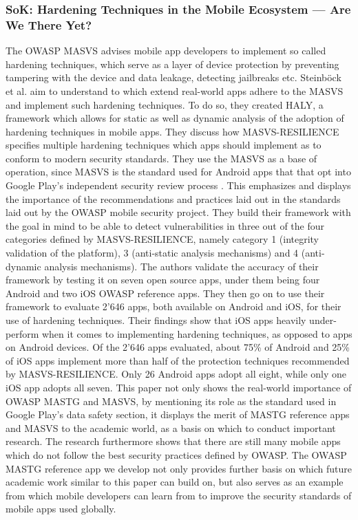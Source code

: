 \subsubsection{SoK: Hardening Techniques in the Mobile Ecosystem — Are We There Yet?}
The OWASP MASVS advises mobile app developers to implement so called hardening techniques, which serve as a layer of device protection by preventing tampering with the device and data leakage, detecting jailbreaks etc. Steinböck et al. \citep{paper_22} aim to understand to which extend real-world apps adhere to the MASVS and implement such hardening techniques. To do so, they created HALY, a framework which allows for static as well as dynamic analysis of the adoption of hardening techniques in mobile apps. They discuss how MASVS-RESILIENCE specifies multiple hardening techniques which apps should implement as to conform to modern security standards. They use the MASVS as a base of operation, since MASVS is the standard used for Android apps that that opt into Google Play’s independent security review process \citep{paper_22}. This emphasizes and displays the importance of the recommendations and practices laid out in the standards laid out by the OWASP mobile security project. They build their framework with the goal in mind to be able to detect vulnerabilities in three out of the four categories defined by MASVS-RESILIENCE, namely category 1 (integrity validation of the platform), 3 (anti-static analysis mechanisms) and  4 (anti-dynamic analysis mechanisms). The authors validate the accuracy of their framework by testing it on seven open source apps, under them being four Android and two iOS OWASP reference apps. They then go on to use their framework to evaluate 2'646 apps, both available on Android and iOS, for their use of hardening techniques. Their findings show that iOS apps heavily under-perform when it comes to implementing hardening techniques, as opposed to apps on Android devices. Of the 2'646 apps evaluated, about 75\% of Android and 25\% of iOS apps implement more than half of the protection techniques recommended by MASVS-RESILIENCE. Only 26 Android apps adopt all eight, while only one iOS app adopts all seven. This paper not only shows the real-world importance of OWASP MASTG and MASVS, by mentioning its role as the standard used in Google Play's data safety section, it displays the merit of MASTG reference apps and MASVS to the academic world, as a basis on which to conduct important research. The research furthermore shows that there are still many mobile apps which do not follow the best security practices defined by OWASP. The OWASP MASTG reference app we develop not only provides further basis on which future academic work similar to this paper can build on, but also serves as an example from which mobile developers can learn from to improve the security standards of mobile apps used globally.